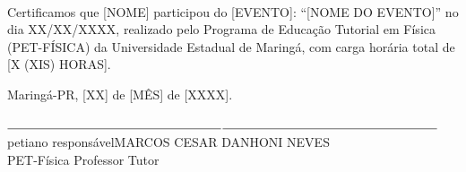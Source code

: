 \documentclass[12pt,a4paper]{memoir}
\begin{document}


\begin{center}
    \\[50pt]
\end{center}


    
    {\fontsize{19pt}{24pt} \selectfont Certificamos que [NOME] participou do [EVENTO]: “[NOME DO EVENTO]” no dia XX/XX/XXXX, realizado pelo Programa de Educação Tutorial em Física (PET-FÍSICA) da Universidade Estadual de Maringá, com carga horária total de [X (XIS) HORAS]. }\\[30pt]
    \begin{center}
    {\fontsize{19pt}{24pt} \selectfont Maringá-PR, [XX] de [MÊS] de [XXXX].}\\[220pt]
    \end{center}
    


\begin{flushleft}
$\rule{6cm}{0.15mm}$\hfill$\rule{6cm}{0.15mm}$\\

\footnotesize{\hspace{40pt} petiano responsável\hfill MARCOS CESAR DANHONI NEVES\\
\hspace{60pt}PET-Física\hspace{185pt} Professor Tutor}
\end{flushleft}
\end{document}

